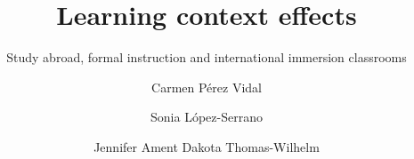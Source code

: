 \title{Learning context effects}  %
\subtitle{Study abroad, formal instruction and international immersion classrooms}
\author{Carmen Pérez Vidal \and  Sonia López-Serrano 	 \and  Jennifer Ament  \lastand  Dakota Thomas-Wilhelm 	 }
\renewcommand{\lsISBNdigital}{000-0-000000-00-0}
\renewcommand{\lsISBNhardcover}{000-0-000000-00-0}
\renewcommand{\lsISBNsoftcover}{000-0-000000-00-0}
\renewcommand{\lsISBNsoftcoverus}{000-0-000000-00-0}
\renewcommand{\lsSeries}{eurosla} %
\renewcommand{\lsSeriesNumber}{1} %
\renewcommand{\lsURL}{http://langsci-press.org/catalog/book/180} %


